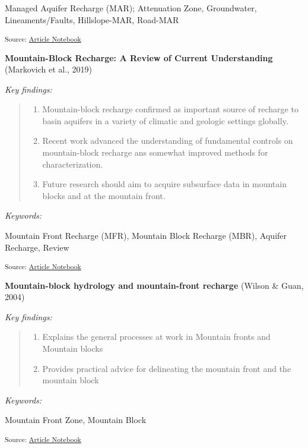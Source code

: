 \documentclass[
]{agujournal2019}
\providecommand{\tightlist}{%
  \setlength{\itemsep}{0pt}\setlength{\parskip}{0pt}}\usepackage{longtable,booktabs,array}
\begin{document}
Managed Aquifer Recharge (MAR); Attenuation Zone, Groundwater,
Lineaments/Faults, Hillslope-MAR, Road-MAR

\textsubscript{Source:
\href{https://Ryan3Lima.github.io/ATUR-Hillslope-Road/index.ipynb.html}{Article
Notebook}}

\textbf{Mountain-Block Recharge: A Review of Current Understanding}
(Markovich et al., 2019)

\emph{Key findings:}

\begin{quote}
\begin{enumerate}
\def\labelenumi{\arabic{enumi}.}
\tightlist
\item
  Mountain-block recharge confirmed as important source of recharge to
  basin aquifers in a variety of climatic and geologic settings
  globally.
\item
  Recent work advanced the understanding of fundamental controls on
  mountain-block recharge ans somewhat improved methods for
  characterization.
\item
  Future research should aim to acquire subsurface data in mountain
  blocks and at the mountain front.
\end{enumerate}
\end{quote}

\emph{Keywords:}

Mountain Front Recharge (MFR), Mountain Block Recharge (MBR), Aquifer
Recharge, Review

\textsubscript{Source:
\href{https://Ryan3Lima.github.io/ATUR-Hillslope-Road/index.ipynb.html}{Article
Notebook}}

\textbf{Mountain-block hydrology and mountain-front recharge} (Wilson \&
Guan, 2004)

\emph{Key findings:}

\begin{quote}
\begin{enumerate}
\def\labelenumi{\arabic{enumi}.}
\tightlist
\item
  Explains the general processes at work in Mountain fronts and Mountain
  blocks
\item
  Provides practical advice for delineating the mountain front and the
  mountain block
\end{enumerate}
\end{quote}

\emph{Keywords:}

Mountain Front Zone, Mountain Block

\textsubscript{Source:
\href{https://Ryan3Lima.github.io/ATUR-Hillslope-Road/index.ipynb.html}{Article
Notebook}}
\end{document}
